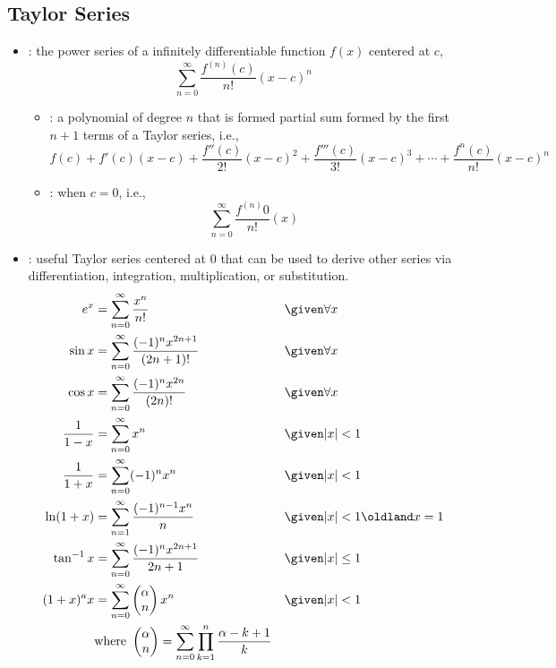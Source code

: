 \newpage %

\subsection{Taylor Series}
\begin{itemize}
  \item {}: the power series of a infinitely differentiable
    function \(f(x)\) centered at \(c\),
    \[%
      \sum_{n=0}^{\infty} \frac{f^{(n)}(c) }{n!} (x-c)^n
    \]%
  \begin{itemize}
    \item {}: a polynomial of degree \(n\)
      that is formed partial sum formed by the first \(n+1\) terms of a Taylor
      series, i.e.,
      \[%
      f(c) + f'(c)(x-c) + \frac{f''(c)}{2!}(x-c)^2 + \frac{f'''(c)}{3!}(x-c)^3
      + \cdots +  \frac{f^n (c)}{n!}(x-c)^n
      \]%
    \item {}: when \(c = 0\), i.e.,
      \[%
        \sum_{n=0}^{\infty} \frac{f^{(n)}0 }{n!} (x)
      \]%
  \end{itemize}

  \item {}: useful Taylor series centered at 0 that
    can be used to derive other series via differentiation, integration,
    multiplication, or substitution.
    \begin{align*}
      e^x &= \sum_{n=0}^{\infty} \frac{x^n}{n!} && \given \forall x\\
      \sin x &= \sum_{n=0}^{\infty} \frac{(-1)^n x^{2n+1} }{(2n+1)!}  && \given \forall x \\
      \cos x &= \sum_{n=0}^{\infty} \frac{(-1)^n x^{2n} }{(2n)!} && \given  \forall x\\
      \frac{1}{1-x} &= \sum_{n=0}^{\infty} x^n && \given |x| < 1 \\
      \frac{1}{1+x} &= \sum_{n=0}^{\infty} (-1)^n x^n && \given |x| < 1 \\
      \ln (1+x) &= \sum_{n=1}^{\infty}  \frac{(-1)^{n-1}x^n }{n} && \given  |x| < 1 \oldland x = 1\\
      \tan ^{-1} x &= \sum_{n=0}^{\infty}  \frac{(-1)^n x^{2n+1} }{2n+1} && \given |x| \leq 1 \\
      (1 + x)^a x &= \sum_{n=0}^{\infty} \begin{pmatrix} \alpha \\ n
      \end{pmatrix} x^n  && \given |x| < 1 \\
                  &\text{where}~ \begin{pmatrix} \alpha \\ n \end{pmatrix} = \sum_{n=0}^{\infty} \prod_{k=1}^{n} \frac{\alpha - k + 1}{k}
      \end{align*}

\end{itemize}

